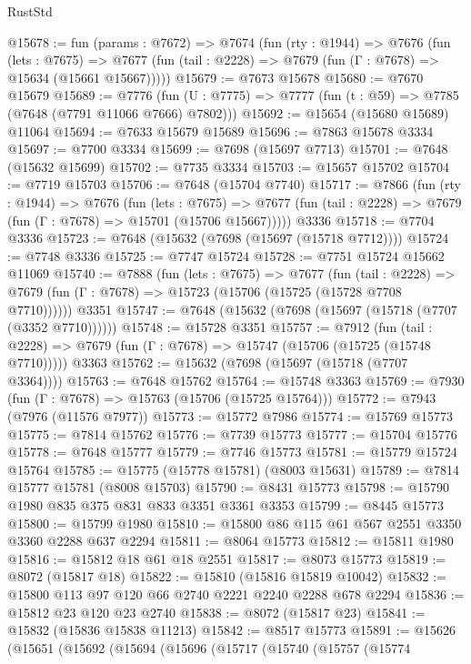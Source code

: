 \begin{lexlean}{RustStd}
\begin{coremodule}
{\begin{coremodule}
{{{{{{{{{{{{{{{{{{{{{{{{{{{{{{{{{{{{{{{{{{{{{{{{{{{{{@15678 := fun (params : @7672) =>
  @7674
    (fun (rty : @1944) =>
    @7676
      (fun (lets : @7675) =>
      @7677 (fun (tail : @2228) => @7679 (fun (Γ : @7678) => @15634 (@15661 @15667)))))
@15679 := @7673 @15678
@15680 := @7670 @15679
@15689 := @7776
    (fun (U : @7775) => @7777 (fun (t : @59) => @7785 (@7648 (@7791 @11066 @7666) @7802)))
@15692 := @15654 (@15680 @15689) @11064
@15694 := @7633 @15679 @15689
@15696 := @7863 @15678 @3334
@15697 := @7700 @3334
@15699 := @7698 (@15697 @7713)
@15701 := @7648 (@15632 @15699)
@15702 := @7735 @3334
@15703 := @15657 @15702
@15704 := @7719 @15703
@15706 := @7648 (@15704 @7740)
@15717 := @7866
    (fun (rty : @1944) =>
    @7676
      (fun (lets : @7675) =>
      @7677 (fun (tail : @2228) => @7679 (fun (Γ : @7678) => @15701 (@15706 @15667)))))
    @3336
@15718 := @7704 @3336
@15723 := @7648 (@15632 (@7698 (@15697 (@15718 @7712))))
@15724 := @7748 @3336
@15725 := @7747 @15724
@15728 := @7751 @15724 @15662 @11069
@15740 := @7888
    (fun (lets : @7675) =>
    @7677
      (fun (tail : @2228) =>
      @7679 (fun (Γ : @7678) => @15723 (@15706 (@15725 (@15728 @7708 @7710))))))
    @3351
@15747 := @7648 (@15632 (@7698 (@15697 (@15718 (@7707 (@3352 @7710))))))
@15748 := @15728 @3351
@15757 := @7912
    (fun (tail : @2228) => @7679 (fun (Γ : @7678) => @15747 (@15706 (@15725 (@15748 @7710)))))
    @3363
@15762 := @15632 (@7698 (@15697 (@15718 (@7707 @3364))))
@15763 := @7648 @15762
@15764 := @15748 @3363
@15769 := @7930 (fun (Γ : @7678) => @15763 (@15706 (@15725 @15764)))
@15772 := @7943 (@7976 (@11576 @7977))
@15773 := @15772 @7986
@15774 := @15769 @15773
@15775 := @7814 @15762
@15776 := @7739 @15773
@15777 := @15704 @15776
@15778 := @7648 @15777
@15779 := @7746 @15773
@15781 := @15779 @15724 @15764
@15785 := @15775 (@15778 @15781) (@8003 @15631)
@15789 := @7814 @15777 @15781 (@8008 @15703)
@15790 := @8431 @15773
@15798 := @15790 @1980 @835 @375 @831 @833 @3351 @3361 @3353
@15799 := @8445 @15773
@15800 := @15799 @1980
@15810 := @15800 @86 @115 @61 @567 @2551 @3350 @3360 @2288 @637 @2294
@15811 := @8064 @15773
@15812 := @15811 @1980
@15816 := @15812 @18 @61 @18 @2551
@15817 := @8073 @15773
@15819 := @8072 (@15817 @18)
@15822 := @15810 (@15816 @15819 @10042)
@15832 := @15800 @113 @97 @120 @66 @2740 @2221 @2240 @2288 @678 @2294
@15836 := @15812 @23 @120 @23 @2740
@15838 := @8072 (@15817 @23)
@15841 := @15832 (@15836 @15838 @11213)
@15842 := @8517 @15773
@15891 := @15626
    (@15651
      (@15692
        (@15694
          (@15696
            (@15717
              (@15740
                (@15757
                  (@15774
}}}}}}}}}}}}}}}}}}}}}}}}}}}}}}}}}}}}}}}}}}}}}}}}}}}}}
\end{coremodule}}
\end{coremodule}
\end{lexlean}
